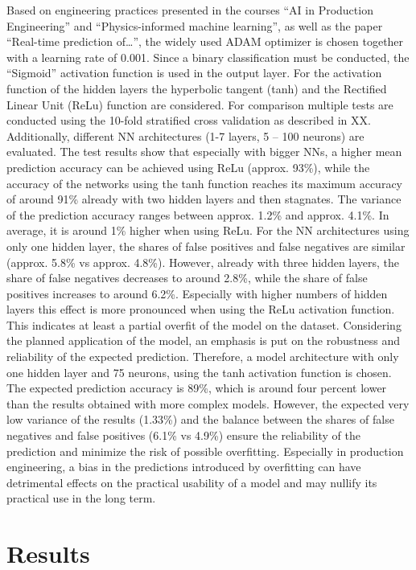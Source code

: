 \documentclass[12pt]{report}
\begin{document}
Based on engineering practices presented in the courses “AI in Production Engineering” and “Physics-informed machine learning”, as well as the paper “Real-time prediction of…”, the widely used ADAM optimizer is chosen together with a learning rate of 0.001. 
Since a binary classification must be conducted, the “Sigmoid” activation function is used in the output layer.
For the activation function of the hidden layers the hyperbolic tangent (tanh) and the Rectified Linear Unit (ReLu) function are considered. For comparison multiple tests are conducted using the 10-fold stratified cross validation as described in XX. Additionally, different NN architectures (1-7 layers, 5 – 100 neurons) are evaluated. 
The test results show that especially with bigger NNs, a higher mean prediction accuracy can be achieved using ReLu (approx. 93\%), while the accuracy of the networks using the tanh function reaches its maximum accuracy of around 91\% already with two hidden layers and then stagnates.
The variance of the prediction accuracy ranges between approx. 1.2\% and approx. 4.1\%. In average, it is around 1\% higher when using ReLu.
For the NN architectures using only one hidden layer, the shares of false positives and false negatives are similar (approx. 5.8\% vs approx. 4.8\%). However, already with three hidden layers, the share of false negatives decreases to around 2.8\%, while the share of false positives increases to around 6.2\%. Especially with higher numbers of hidden layers this effect is more pronounced when using the ReLu activation function. This indicates at least a partial overfit of the model on the dataset.
Considering the planned application of the model, an emphasis is put on the robustness and reliability of the expected prediction. Therefore, a model architecture with only one hidden layer and 75 neurons, using the tanh activation function is chosen. The expected prediction accuracy is 89\%, which is around four percent lower than the results obtained with more complex models. However, the expected very low variance of the results (1.33\%) and the balance between the shares of false negatives and false positives (6.1\% vs 4.9\%) ensure the reliability of the prediction and minimize the risk of possible overfitting. Especially in production engineering, a bias in the predictions introduced by overfitting can have detrimental effects on the practical usability of a model and may nullify its practical use in the long term.

\chapter{Results}
\end{document}
